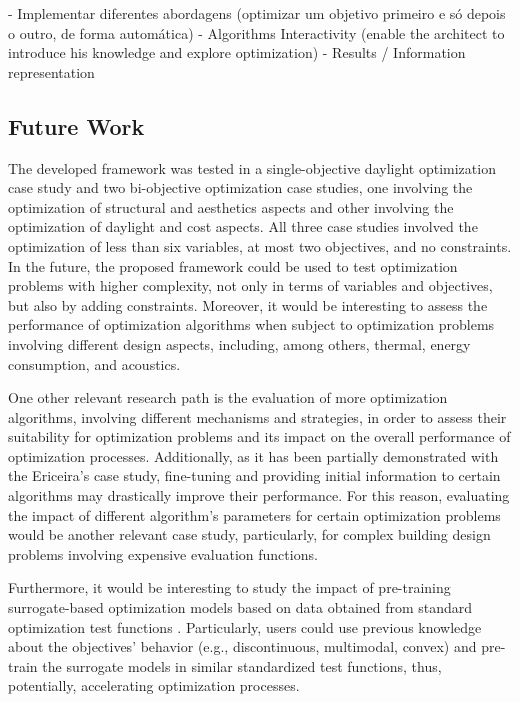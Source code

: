 - Implementar diferentes abordagens (optimizar um objetivo primeiro e só depois o outro, de forma automática)
- Algorithms Interactivity (enable the architect to introduce his knowledge and explore optimization)
- Results / Information representation

\subsection{Future Work}
The developed framework was tested in a single-objective daylight optimization case study and two bi-objective optimization case studies, one involving the optimization of structural and aesthetics aspects and other involving the optimization of daylight and cost aspects. All three case studies involved the optimization of less than six variables, at most two objectives, and no constraints. In the future, the proposed framework could be used to test optimization problems with higher complexity, not only in terms of variables and objectives, but also by adding constraints. Moreover, it would be interesting to assess the performance of optimization algorithms when subject to optimization problems involving different design aspects, including, among others, thermal, energy consumption, and acoustics. 
 
One other relevant research path is the evaluation of more optimization algorithms, involving different mechanisms and strategies, in order to assess their suitability for optimization problems and its impact on the overall performance of optimization processes. Additionally, as it has been partially demonstrated with the Ericeira's case study, fine-tuning and providing initial information to certain algorithms may drastically improve their performance. For this reason, evaluating the impact of different algorithm's parameters for certain optimization problems would be another relevant case study, particularly, for complex building design problems involving expensive evaluation functions. 

Furthermore, it would be interesting to study the impact of pre-training surrogate-based optimization models based on data obtained from standard optimization test functions . Particularly, users could use previous knowledge about the objectives' behavior (e.g., discontinuous, multimodal, convex) and pre-train the surrogate models in similar standardized test functions, thus, potentially, accelerating optimization processes. %

